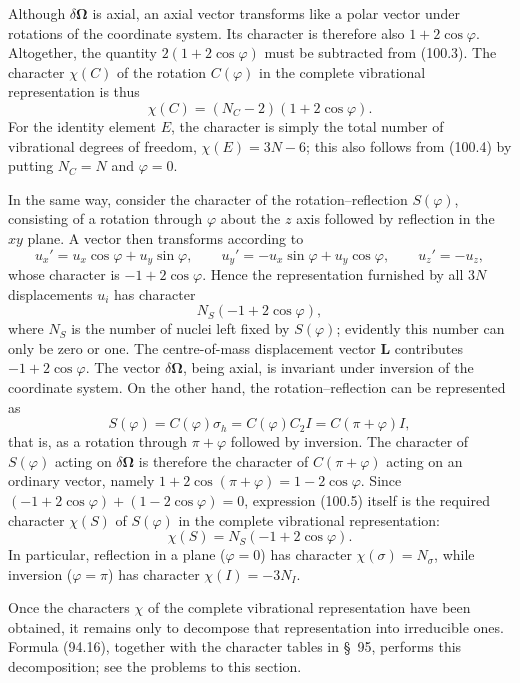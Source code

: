 Although $\delta\boldsymbol\Omega$ is axial, an axial vector transforms like a polar vector under rotations of the coordinate system. Its character is therefore also $1+2\cos\varphi$. Altogether, the quantity $2(1+2\cos\varphi)$ must be subtracted from (100.3). The character $\chi(C)$ of the rotation $C(\varphi)$ in the complete vibrational representation is thus
\begin{equation}
 \chi(C)=(N_C-2)(1+2\cos\varphi). \tag{100.4}
\end{equation}
For the identity element $E$, the character is simply the total number of vibrational degrees of freedom, $\chi(E)=3N-6$; this also follows from (100.4) by putting $N_C=N$ and $\varphi=0$.

In the same way, consider the character of the rotation--reflection $S(\varphi)$, consisting of a rotation through $\varphi$ about the $z$ axis followed by reflection in the $xy$ plane. A vector then transforms according to
\[
 u_x'=u_x\cos\varphi+u_y\sin\varphi,\qquad
 u_y'=-u_x\sin\varphi+u_y\cos\varphi,\qquad
 u_z'=-u_z,
\]
whose character is $-1+2\cos\varphi$. Hence the representation furnished by all $3N$ displacements $u_i$ has character
\begin{equation}
 N_S(-1+2\cos\varphi), \tag{100.5}
\end{equation}
where $N_S$ is the number of nuclei left fixed by $S(\varphi)$; evidently this number can only be zero or one. The centre-of-mass displacement vector $\mathbf L$ contributes $-1+2\cos\varphi$. The vector $\delta\boldsymbol\Omega$, being axial, is invariant under inversion of the coordinate system. On the other hand, the rotation--reflection can be represented as
\[
 S(\varphi)=C(\varphi)\sigma_h=C(\varphi)C_2I=C(\pi+\varphi)I,
\]
that is, as a rotation through $\pi+\varphi$ followed by inversion. The character of $S(\varphi)$ acting on $\delta\boldsymbol\Omega$ is therefore the character of $C(\pi+\varphi)$ acting on an ordinary vector, namely $1+2\cos(\pi+\varphi)=1-2\cos\varphi$. Since $(-1+2\cos\varphi)+(1-2\cos\varphi)=0$, expression (100.5) itself is the required character $\chi(S)$ of $S(\varphi)$ in the complete vibrational representation:
\begin{equation}
 \chi(S)=N_S(-1+2\cos\varphi). \tag{100.6}
\end{equation}
In particular, reflection in a plane ($\varphi=0$) has character $\chi(\sigma)=N_\sigma$, while inversion ($\varphi=\pi$) has character $\chi(I)=-3N_I$.

Once the characters $\chi$ of the complete vibrational representation have been obtained, it remains only to decompose that representation into irreducible ones. Formula (94.16), together with the character tables in \S~95, performs this decomposition; see the problems to this section.

